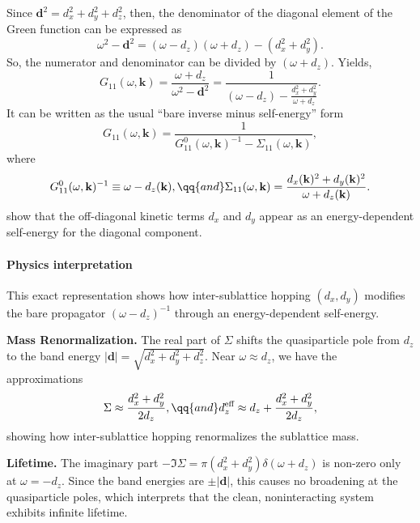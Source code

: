 \begin{solution}
  Since $\mathbf d^2 = d_x^2 + d_y^2 + d_z^2$, then, the denominator of the
  diagonal element of the Green function can be expressed as
  \[
    \omega^2 - \mathbf d^2 = (\omega - d_z)(\omega + d_z) - (d_x^2 + d_y^2).
  \]
  So, the numerator and denominator can be divided by $(\omega + d_z)$. Yields,
  \[
    G_{11}(\omega, \mathbf k) = \frac{\omega + d_z}{\omega^2 - \mathbf d^2}
  = \frac1{(\omega - d_z) - \frac{d_x^2 + d_y^2}{\omega + d_z}}.
  \]
  It can be written as the usual ``bare inverse minus self-energy'' form
  \[
    G_{11}(\omega, \mathbf k)
  = \frac1{G_{11}^0(\omega, \mathbf k)^{-1} - \Sigma_{11}(\omega, \mathbf k)},
  \]
  where
  \[
    G_{11}^0(\omega, \mathbf k)^{-1} \equiv \omega - d_z(\mathbf k), \qq{and}
    \Sigma_{11}(\omega, \mathbf k)
  = \frac{d_x(\mathbf k)^2 + d_y(\mathbf k)^2}{\omega + d_z(\mathbf k)}.
  \]
  show that the off-diagonal kinetic terms $d_x$ and $d_y$ appear as an
  energy-dependent self-energy for the diagonal component.
  \paragraph{Physics interpretation}
  This exact representation shows how inter-sublattice hopping $(d_x, d_y)$
  modifies the bare propagator $(\omega - d_z)^{-1}$ through an energy-dependent
  self-energy.
  \begin{enumext}
    \item \textbf{Mass Renormalization.}
    The real part of $\Sigma$ shifts the quasiparticle pole from $d_z$ to the
    band energy $|\mathbf d| = \sqrt{d_x^2 + d_y^2 + d_z^2}$.
    Near $\omega \approx d_z$, we have the approximations
    \[
      \Sigma \approx \frac{d_x^2 + d_y^2}{2d_z}, \qq{and}
      d_z^\text{eff} \approx d_z + \frac{d_x^2 + d_y^2}{2d_z},
    \]
    showing how inter-sublattice hopping renormalizes the sublattice mass.
    \item \textbf{Lifetime.}
    The imaginary part $-\Im\Sigma = \pi(d_x^2 + d_y^2)\delta(\omega + d_z)$
    is non-zero only at $\omega = -d_z$. Since the band energies are
    $\pm|\mathbf d|$, this causes no broadening at the quasiparticle poles,
    which interprets that the clean, noninteracting system exhibits infinite
    lifetime.
  \end{enumext}
\end{solution}